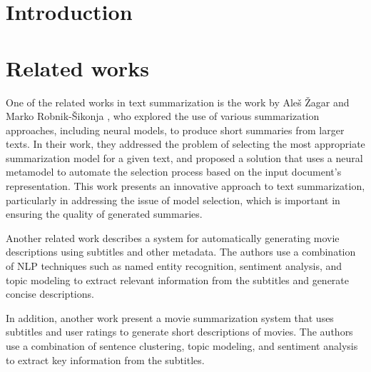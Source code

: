 \documentclass[fleqn,moreauthors,10pt]{ds_report}
\affiliation{\textit{Advisor: Slavko Žitnik}}
\begin{document}
\flushbottom 

\maketitle 

\thispagestyle{empty} 


\section*{Introduction}

\section*{Related works}

One of the related works in text summarization is the work by Aleš Žagar and Marko  Robnik-Šikonja \cite{zagar2022}, who explored the use of various summarization approaches, including neural models, to produce short summaries from larger texts. In their work, they addressed the problem of selecting the most appropriate summarization model for a given text, and proposed a solution that uses a neural metamodel to automate the selection process based on the input document's representation. This work presents an innovative approach to text summarization, particularly in addressing the issue of model selection, which is important in ensuring the quality of generated summaries.

Another related work \cite{subramanian2017automatic} describes a system for automatically generating movie descriptions using subtitles and other metadata. The authors use a combination of NLP techniques such as named entity recognition, sentiment analysis, and topic modeling to extract relevant information from the subtitles and generate concise descriptions.

In addition, another work \cite{huang2020movie} present a movie summarization system that uses subtitles and user ratings to generate short descriptions of movies. The authors use a combination of sentence clustering, topic modeling, and sentiment analysis to extract key information from the subtitles.
\end{document}
